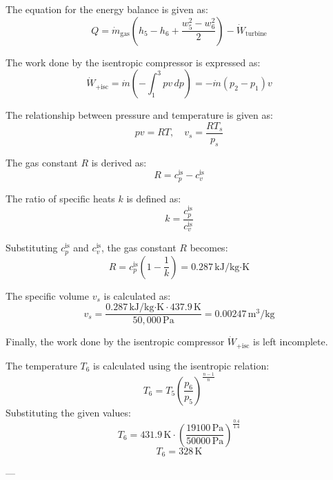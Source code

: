 The equation for the energy balance is given as:  
\[
Q = \dot{m}_{\text{gas}} \left( h_5 - h_6 + \frac{w_5^2 - w_6^2}{2} \right) - \dot{W}_{\text{turbine}}
\]  

The work done by the isentropic compressor is expressed as:  
\[
\dot{W}_{\text{+isc}} = \dot{m} \left( - \int_{1}^{3} p v \, dp \right) = -\dot{m} \left( p_2 - p_1 \right) v
\]  

The relationship between pressure and temperature is given as:  
\[
p v = R T, \quad v_s = \frac{R T_s}{p_s}
\]  

The gas constant \( R \) is derived as:  
\[
R = c_p^{\text{is}} - c_v^{\text{is}}
\]  

The ratio of specific heats \( k \) is defined as:  
\[
k = \frac{c_p^{\text{is}}}{c_v^{\text{is}}}
\]  

Substituting \( c_p^{\text{is}} \) and \( c_v^{\text{is}} \), the gas constant \( R \) becomes:  
\[
R = c_p^{\text{is}} \left( 1 - \frac{1}{k} \right) = 0.287 \, \text{kJ}/\text{kg·K}
\]  

The specific volume \( v_s \) is calculated as:  
\[
v_s = \frac{0.287 \, \text{kJ}/\text{kg·K} \cdot 437.9 \, \text{K}}{50,000 \, \text{Pa}} = 0.00247 \, \text{m}^3/\text{kg}
\]  

Finally, the work done by the isentropic compressor \( \dot{W}_{\text{+isc}} \) is left incomplete.

The temperature \( T_6 \) is calculated using the isentropic relation:  
\[
T_6 = T_5 \left( \frac{p_6}{p_5} \right)^{\frac{n-1}{n}}
\]  
Substituting the given values:  
\[
T_6 = 431.9 \, \text{K} \cdot \left( \frac{19100 \, \text{Pa}}{50000 \, \text{Pa}} \right)^{\frac{0.4}{1.4}}
\]  
\[
T_6 = 328 \, \text{K}
\]  

---